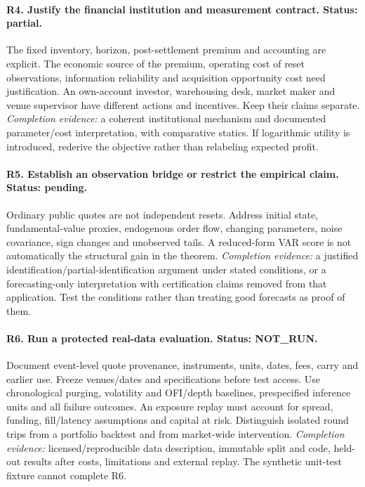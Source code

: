 \paragraph{R4. Justify the financial institution and measurement contract. Status: partial.}
The fixed inventory, horizon, post-settlement premium and accounting are explicit.
The economic source of the premium, operating cost of reset observations,
information reliability and acquisition opportunity cost need justification.
An own-account investor, warehousing desk, market maker and venue supervisor
have different actions and incentives. Keep their claims separate.
\emph{Completion evidence:} a coherent institutional mechanism and documented
parameter/cost interpretation, with comparative statics. If logarithmic utility
is introduced, rederive the objective rather than relabeling expected profit.

\paragraph{R5. Establish an observation bridge or restrict the empirical claim. Status: pending.}
Ordinary public quotes are not independent resets. Address initial state,
fundamental-value proxies, endogenous order flow, changing parameters, noise
covariance, sign changes and unobserved tails. A reduced-form VAR score is not
automatically the structural gain in the theorem.
\emph{Completion evidence:} a justified identification/partial-identification
argument under stated conditions, or a forecasting-only interpretation with
certification claims removed from that application. Test the conditions rather
than treating good forecasts as proof of them.

\paragraph{R6. Run a protected real-data evaluation. Status: NOT\_RUN.}
Document event-level quote provenance, instruments, units, dates, fees, carry
and earlier use. Freeze venues/dates and specifications before test access.
Use chronological purging, volatility and OFI/depth baselines, prespecified
inference units and all failure outcomes. An exposure replay must account for
spread, funding, fill/latency assumptions and capital at risk. Distinguish
isolated round trips from a portfolio backtest and from market-wide intervention.
\emph{Completion evidence:} licensed/reproducible data description, immutable
split and code, held-out results after costs, limitations and external replay.
The synthetic unit-test fixture cannot complete R6.

